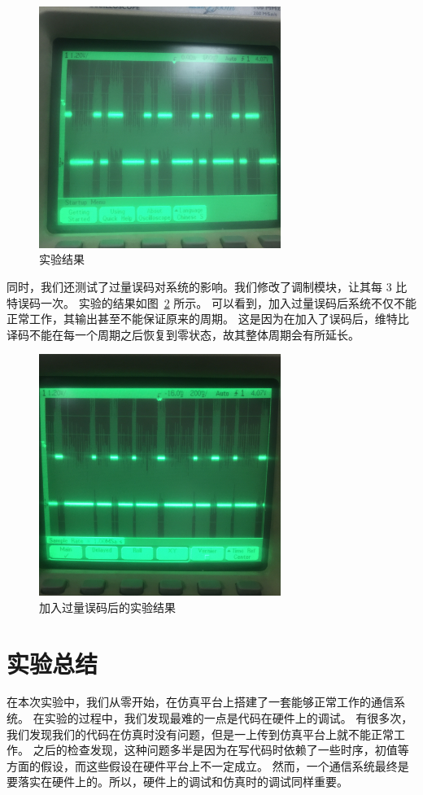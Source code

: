 \documentclass[UTF8]{ctexart}
\begin{document}
\begin{figure}[htbp]
    \centering
    \includegraphics[width=0.7\textwidth]{figs/correct}
    \caption{实验结果}
    \label{fig:correct}
\end{figure}

同时，我们还测试了过量误码对系统的影响。我们修改了调制模块，让其每 3 比特误码一次。
实验的结果如图~\ref{fig:wrong} 所示。
可以看到，加入过量误码后系统不仅不能正常工作，其输出甚至不能保证原来的周期。
这是因为在加入了误码后，维特比译码不能在每一个周期之后恢复到零状态，故其整体周期会有所延长。

\begin{figure}[htbp]
    \centering
    \includegraphics[width=0.7\textwidth]{figs/wrong}
    \caption{加入过量误码后的实验结果}
    \label{fig:wrong}
\end{figure}


\section{实验总结}

在本次实验中，我们从零开始，在仿真平台上搭建了一套能够正常工作的通信系统。
在实验的过程中，我们发现最难的一点是代码在硬件上的调试。
有很多次，我们发现我们的代码在仿真时没有问题，但是一上传到仿真平台上就不能正常工作。
之后的检查发现，这种问题多半是因为在写代码时依赖了一些时序，初值等方面的假设，而这些假设在硬件平台上不一定成立。
然而，一个通信系统最终是要落实在硬件上的。所以，硬件上的调试和仿真时的调试同样重要。
\end{document}
